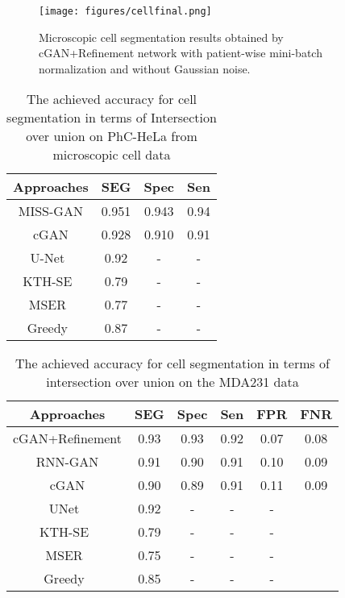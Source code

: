 \documentclass[10pt,twocolumn,letterpaper]{article}
\begin{document}
\begin{figure}
\texttt{[image: figures/cellfinal.png]}
\centering
\caption{Microscopic cell segmentation results obtained by cGAN+Refinement network with patient-wise mini-batch normalization and without Gaussian noise.}
\label{figcall}
\end{figure}\begin{table}[!htbp]
\centering
\caption{The achieved accuracy for cell segmentation in terms of Intersection over union on PhC-HeLa from microscopic cell data}
\begin{tabular}{*4c} 
\toprule
Approaches    &  SEG & Spec  & Sen \\
\midrule
MISS-GAN   & 0.951 & 0.943  & 0.94   \\
cGAN   &  0.928 & 0.910  & 0.91   \\
U-Net~\cite{ronneberger2015u}   &  0.92 & -  & -    \\
KTH-SE~\cite{magnusson2012batch}  &  0.79 & -  & - \\
MSER~\cite{arteta2012learning} &  0.77 & -  & - \\
Greedy~\cite{Akram}&  0.87 & -  & - \\
\bottomrule
\end{tabular}
\label{tabel_cell1}
\end{table}\begin{table}[!htbp]
\centering
\caption{The achieved accuracy for cell segmentation in terms of intersection over union on the MDA231 data}
\begin{tabular}{*6c} 
\toprule
Approaches & SEG & Spec  & Sen & FPR & FNR  \\
\midrule
cGAN+Refinement  & 0.93 & 0.93 & 0.92 &  0.07   & 0.08   \\
RNN-GAN   &  0.91 & 0.90  & 0.91  & 0.10   & 0.09  \\
cGAN   &  0.90 & 0.89  & 0.91  & 0.11   & 0.09  \\
UNet~\cite{ronneberger2015u}   &  0.92 & -  & -  & -    \\
KTH-SE~\cite{magnusson2012batch}   &  0.79 & -  & - & -   \\
MSER~\cite{arteta2012learning} &  0.75 & -  & - & -  \\
Greedy~\cite{Akram}&  0.85 & -  & - & -  \\
\bottomrule
\end{tabular}
\label{tabel_cell2}
\end{table}\begin{figure*}[!t]
  \centering

\end{figure*}
\end{document}
